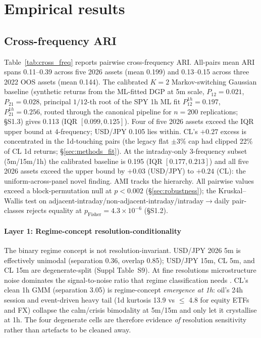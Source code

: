 \documentclass[preprint,12pt,authoryear]{elsarticle}
\begin{document}
\section{Empirical results}

\subsection{Cross-frequency ARI}
\label{sec:cross_freq}

Table~\ref{tab:cross_freq} reports pairwise cross-frequency ARI. All-pairs mean ARI spans 0.11--0.39 across five 2026 assets (mean 0.199) and 0.13--0.15 across three 2022 OOS assets (mean 0.144). The calibrated $K{=}2$ Markov-switching Gaussian baseline (synthetic returns from the ML-fitted DGP at 5m scale, $P_{12}{=}0.021$, $P_{21}{=}0.028$, principal $1/12$-th root of the SPY 1h ML fit $P_{12}^{1h}{=}0.197$, $P_{21}^{1h}{=}0.256$, routed through the canonical pipeline for $n{=}200$ replications; \S{}S1.3) gives 0.113 (IQR $[0.099, 0.125]$). Four of five 2026 assets exceed the IQR upper bound at 4-frequency; USD/JPY 0.105 lies within. CL's $+0.27$ excess is concentrated in the 1d-touching pairs (the legacy flat $\pm 3\%$ cap had clipped 22\% of CL 1d returns; \S\ref{sec:methods_fit}). At the intraday-only 3-frequency subset (5m/15m/1h) the calibrated baseline is 0.195 (IQR $[0.177, 0.213]$) and all five 2026 assets exceed the upper bound by $+0.03$ (USD/JPY) to $+0.24$ (CL): the uniform-across-panel novel finding. AMI tracks the hierarchy. All pairwise values exceed a block-permutation null at $p<0.002$ (\S\ref{sec:robustness}); the Kruskal--Wallis test on adjacent-intraday/non-adjacent-intraday/intraday$\to$daily pair-classes rejects equality at $p_{\text{Fisher}}=4.3{\times}10^{-6}$ (\S{}S1.2).

\paragraph{Layer 1: Regime-concept resolution-conditionality} The binary regime concept is not resolution-invariant. USD/JPY 2026 5m is effectively unimodal (separation 0.36, overlap 0.85); USD/JPY 15m, CL 5m, and CL 15m are degenerate-split (Suppl Table~S9). At fine resolutions microstructure noise dominates the signal-to-noise ratio that regime classification needs \citep{AitSahaliaMykland2005,GencaySelcukWhitcher2001}. CL's clean 1h GMM (separation 3.05) is regime-concept \emph{emergence at 1h}: oil's 24h session and event-driven heavy tail (1d kurtosis 13.9 vs $\le$ 4.8 for equity ETFs and FX) collapse the calm/crisis bimodality at 5m/15m and only let it crystallise at 1h. The four degenerate cells are therefore evidence \emph{of} resolution sensitivity rather than artefacts to be cleaned away.
\end{document}
